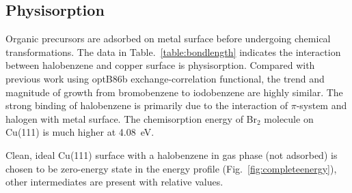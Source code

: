 \documentclass[%
 reprint,
 amsmath,amssymb,
 aps,
prb,
floatfix,
]{revtex4-2}
\newcommand{\lock}{\color{red}}
\newcommand{\zhzh}{\color{blue}}
\newcommand{\lock}{\color{red}}
\newcommand{\zhzh}{\color{blue}}
\newcommand{\comm}{\color{Purple}} %
\begin{document}
\subsection{Physisorption}

{\zhzh
Organic precursors are adsorbed on metal surface before undergoing chemical transformations. 
The data in Table.~\ref{table:bondlength} indicates the interaction between halobenzene and copper surface is physisorption. Compared with previous work using optB86b exchange-correlation functional, the trend and magnitude of growth from bromobenzene to iodobenzene are highly similar. The strong binding of halobenzene is primarily due to the interaction of $\pi$-system and halogen with metal surface. The chemisorption energy of Br$_2$ molecule on Cu(111) is much higher at \SI{4.08}{\electronvolt}.




}

{\comm Clean, ideal Cu(111) surface with a halobenzene in gas phase (not adsorbed) is chosen to be zero-energy state in the energy profile (Fig.~\ref{fig:completeenergy}), other intermediates are present with relative values.}
\end{document}
